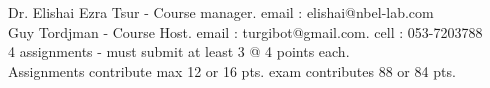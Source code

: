 \documentclass[preview]{standalone}
\begin{document}
Dr. Elishai Ezra Tsur - Course manager.     email : elishai@nbel-lab.com\\Guy Tordjman - Course Host.     email : turgibot@gmail.com.     cell : 053-7203788\\4 assignments - must submit at least 3 @ 4 points each.\\Assignments contribute max 12 or 16 pts. exam contributes 88 or 84 pts.\\
\end{document}
